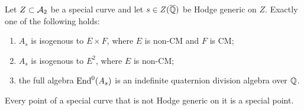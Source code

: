 \begin{proposition}\label{fin:classification}
Let $Z\subset\mathcal A_2$ be a special curve and let $s\in Z(\overline{\mathbb Q})$
be Hodge generic on $Z$. Exactly one of the following holds:
\begin{enumerate}[label=\textup{(\roman*)}]
\item $A_s$ is isogenous to $E\times F$, where $E$ is non-CM
and $F$ is CM;
\item $A_s$ is isogenous to $E^2$, where $E$ is non-CM;
\item the full algebra $\operatorname{End}^0(A_s)$ is an indefinite quaternion
division algebra over $\mathbb Q$.
\end{enumerate}
Every point of a special curve that is not Hodge generic on it is a
special point.
\end{proposition}

